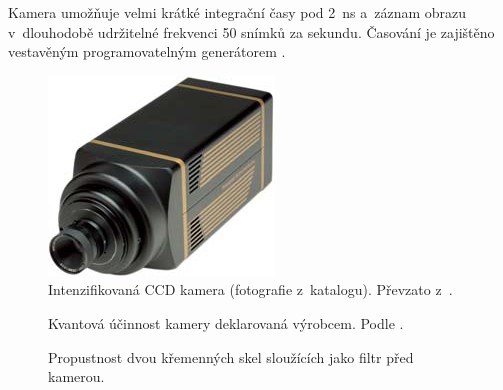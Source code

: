 Kamera umožňuje velmi krátké integrační časy pod \SI{2}{\nano\second}
a~záznam obrazu v~dlouhodobě udržitelné frekvenci 50 snímků za sekundu.
Časování je zajištěno vestavěným programovatelným generátorem .
\autocite{pimax-datasheet}

\begin{figure}[htp]
	\centering
	\includegraphics[scale=0.4]{img/pimax-1024}
	\caption{Intenzifikovaná CCD kamera 
		(fotografie z~katalogu).
		Převzato z~\cite{pimax-datasheet}.}
	\label{fig:instruments-camera}
\end{figure}

\begin{figure}[htp]
	\centering
	
	\caption{Kvantová účinnost kamery deklarovaná výrobcem.
		Podle \cite{pimax-datasheet}.}
	\label{fig:instruments-cameraeff}
\end{figure}

\begin{figure}[htp]
	\centering
	
	\caption{Propustnost dvou křemenných skel sloužících jako filtr
		před kamerou.}
	\label{fig:instruments-camerafilter}
\end{figure}
